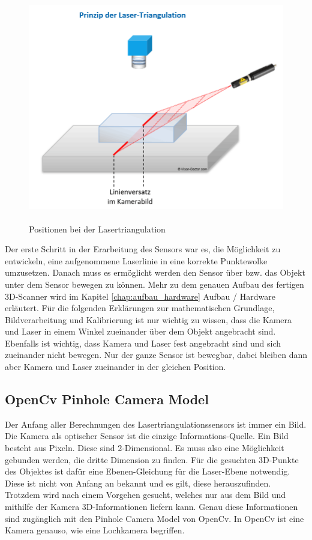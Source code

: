 	\begin{figure}[h]
		\centering
		\includegraphics[height=10cm]{img/grundlagen/lasertriangulation_2}
		\caption{Positionen bei der Lasertriangulation}
		\label{fig:lasertriangulation_position}
	\end{figure}
	
	Der erste Schritt in der Erarbeitung des Sensors war es, die Möglichkeit zu entwickeln, eine aufgenommene Laserlinie in eine korrekte Punktewolke umzusetzen. Danach muss es ermöglicht werden den Sensor über bzw. das Objekt unter dem Sensor bewegen zu können. Mehr zu dem genauen Aufbau des fertigen 3D-Scanner wird im Kapitel \ref{chap:aufbau_hardware} Aufbau / Hardware erläutert. Für die folgenden Erklärungen zur mathematischen Grundlage, Bildverarbeitung und Kalibrierung ist nur wichtig zu wissen, dass die Kamera und Laser in einem Winkel zueinander über dem Objekt angebracht sind. Ebenfalls ist wichtig, dass Kamera und Laser fest angebracht sind und sich zueinander nicht bewegen. Nur der ganze Sensor ist bewegbar, dabei bleiben dann aber Kamera und Laser zueinander in der gleichen Position.
	\label{chap:grundlegender_aufbau}
	
	\subsection{OpenCv Pinhole Camera Model}
	Der Anfang aller Berechnungen des Lasertriangulationssensors ist immer ein Bild. Die Kamera als optischer Sensor ist die einzige Informations-Quelle. Ein Bild besteht aus Pixeln. Diese sind 2-Dimensional. Es muss also eine Möglichkeit gebunden werden, die dritte Dimension zu finden. Für die gesuchten 3D-Punkte des Objektes ist dafür eine Ebenen-Gleichung für die Laser-Ebene notwendig. Diese ist nicht von Anfang an bekannt und es gilt, diese herauszufinden. Trotzdem wird nach einem Vorgehen gesucht, welches nur aus dem Bild und mithilfe der Kamera 3D-Informationen liefern kann. Genau diese Informationen sind zugänglich mit den Pinhole Camera Model von OpenCv. In OpenCv ist eine Kamera genauso, wie eine Lochkamera begriffen.
	
